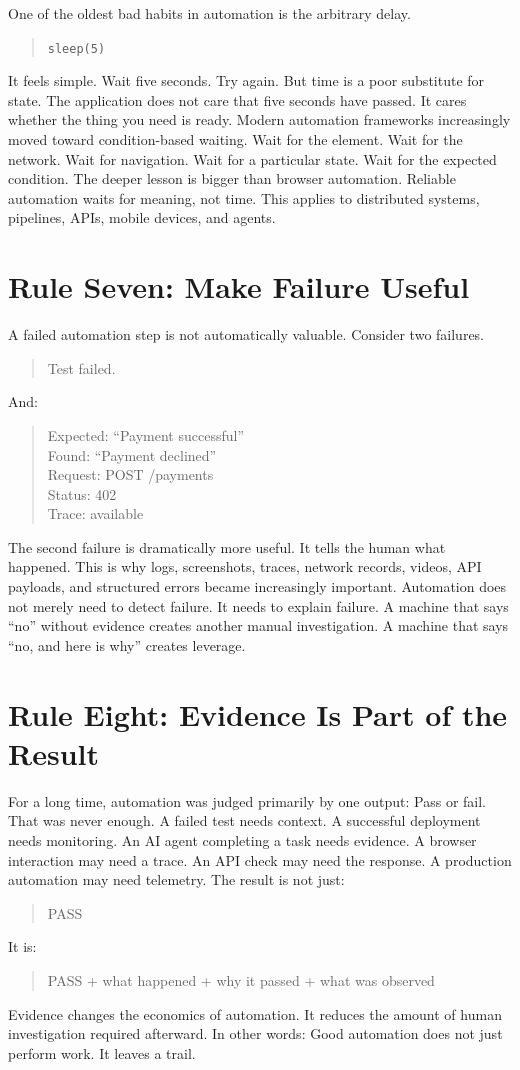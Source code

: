 \documentclass[11pt,twoside]{book}
\begin{document}
One of the oldest bad habits in automation is the arbitrary delay.
\begin{quote}
\texttt{sleep(5)}
\end{quote}
It feels simple.
Wait five seconds.
Try again.
But time is a poor substitute for state.
The application does not care that five seconds have passed.
It cares whether the thing you need is ready.
Modern automation frameworks increasingly moved toward condition-based waiting.
Wait for the element.
Wait for the network.
Wait for navigation.
Wait for a particular state.
Wait for the expected condition.
The deeper lesson is bigger than browser automation.
Reliable automation waits for meaning, not time.
This applies to distributed systems, pipelines, APIs, mobile devices, and agents.

\section*{Rule Seven: Make Failure Useful}

A failed automation step is not automatically valuable.
Consider two failures.
\begin{quote}
Test failed.
\end{quote}
And:
\begin{quote}
Expected: ``Payment successful''\\
Found: ``Payment declined''\\
Request: POST /payments\\
Status: 402\\
Trace: available
\end{quote}
The second failure is dramatically more useful.
It tells the human what happened.
This is why logs, screenshots, traces, network records, videos, API payloads, and structured errors became increasingly important.
Automation does not merely need to detect failure.
It needs to explain failure.
A machine that says ``no'' without evidence creates another manual investigation.
A machine that says ``no, and here is why'' creates leverage.

\section*{Rule Eight: Evidence Is Part of the Result}

For a long time, automation was judged primarily by one output:
Pass or fail.
That was never enough.
A failed test needs context.
A successful deployment needs monitoring.
An AI agent completing a task needs evidence.
A browser interaction may need a trace.
An API check may need the response.
A production automation may need telemetry.
The result is not just:
\begin{quote}
PASS
\end{quote}
It is:
\begin{quote}
PASS + what happened + why it passed + what was observed
\end{quote}
Evidence changes the economics of automation.
It reduces the amount of human investigation required afterward.
In other words:
Good automation does not just perform work. It leaves a trail.
\end{document}
